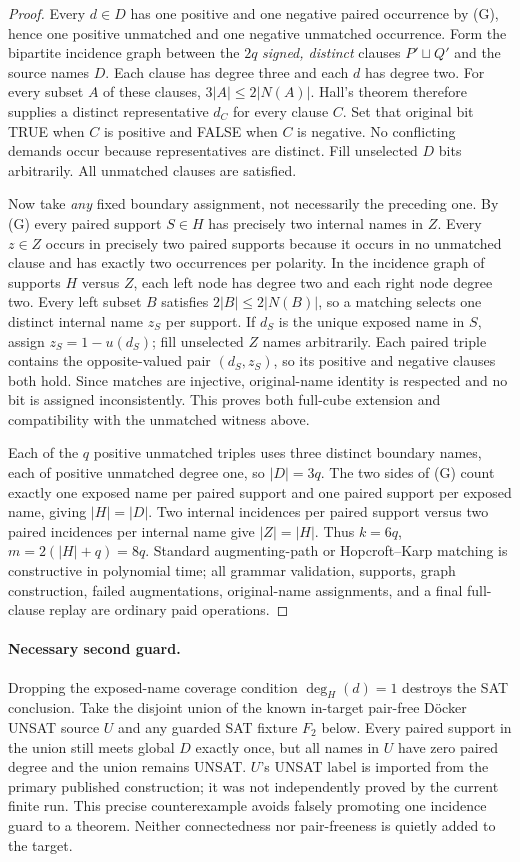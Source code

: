 \documentclass[11pt]{article}
\begin{document}
\begin{proof}
Every $d\in D$ has one positive and one negative paired occurrence by (G), hence one positive unmatched and one negative unmatched occurrence. Form the bipartite incidence graph between the $2q$ \emph{signed, distinct} clauses $P'\sqcup Q'$ and the source names $D$. Each clause has degree three and each $d$ has degree two. For every subset $A$ of these clauses, $3|A|\le 2|N(A)|$. Hall's theorem therefore supplies a distinct representative $d_C$ for every clause $C$. Set that original bit TRUE when $C$ is positive and FALSE when $C$ is negative. No conflicting demands occur because representatives are distinct. Fill unselected $D$ bits arbitrarily. All unmatched clauses are satisfied.

Now take \emph{any} fixed boundary assignment, not necessarily the preceding one. By (G) every paired support $S\in H$ has precisely two internal names in $Z$. Every $z\in Z$ occurs in precisely two paired supports because it occurs in no unmatched clause and has exactly two occurrences per polarity. In the incidence graph of supports $H$ versus $Z$, each left node has degree two and each right node degree two. Every left subset $B$ satisfies $2|B|\le2|N(B)|$, so a matching selects one distinct internal name $z_S$ per support. If $d_S$ is the unique exposed name in $S$, assign $z_S=1-u(d_S)$; fill unselected $Z$ names arbitrarily. Each paired triple contains the opposite-valued pair $(d_S,z_S)$, so its positive and negative clauses both hold. Since matches are injective, original-name identity is respected and no bit is assigned inconsistently. This proves both full-cube extension and compatibility with the unmatched witness above.

Each of the $q$ positive unmatched triples uses three distinct boundary names, each of positive unmatched degree one, so $|D|=3q$. The two sides of (G) count exactly one exposed name per paired support and one paired support per exposed name, giving $|H|=|D|$. Two internal incidences per paired support versus two paired incidences per internal name give $|Z|=|H|$. Thus $k=6q$, $m=2(|H|+q)=8q$. Standard augmenting-path or Hopcroft--Karp matching is constructive in polynomial time; all grammar validation, supports, graph construction, failed augmentations, original-name assignments, and a final full-clause replay are ordinary paid operations.
\end{proof}

\paragraph{Necessary second guard.} Dropping the exposed-name coverage condition $\deg_H(d)=1$ destroys the SAT conclusion. Take the disjoint union of the known in-target pair-free D\"ocker UNSAT source $U$ and any guarded SAT fixture $F_2$ below. Every paired support in the union still meets global $D$ exactly once, but all names in $U$ have zero paired degree and the union remains UNSAT. $U$'s UNSAT label is imported from the primary published construction; it was not independently proved by the current finite run. This precise counterexample avoids falsely promoting one incidence guard to a theorem. Neither connectedness nor pair-freeness is quietly added to the target.
\end{document}
